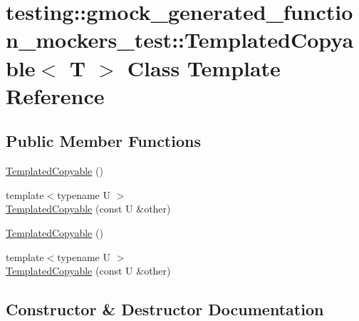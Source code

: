 \hypertarget{classtesting_1_1gmock__generated__function__mockers__test_1_1_templated_copyable}{}\section{testing\+::gmock\+\_\+generated\+\_\+function\+\_\+mockers\+\_\+test\+::Templated\+Copyable$<$ T $>$ Class Template Reference}
\label{classtesting_1_1gmock__generated__function__mockers__test_1_1_templated_copyable}
\subsection*{Public Member Functions}
\begin{DoxyCompactItemize}
\item 
\mbox{\hyperlink{classtesting_1_1gmock__generated__function__mockers__test_1_1_templated_copyable_adf0e1681c62cab82b13f0f97543b25ad}{Templated\+Copyable}} ()
\item 
{\footnotesize template$<$typename U $>$ }\\\mbox{\hyperlink{classtesting_1_1gmock__generated__function__mockers__test_1_1_templated_copyable_aa2602f77d7f6bebfbc35c859637cd1f3}{Templated\+Copyable}} (const U \&other)
\item 
\mbox{\hyperlink{classtesting_1_1gmock__generated__function__mockers__test_1_1_templated_copyable_adf0e1681c62cab82b13f0f97543b25ad}{Templated\+Copyable}} ()
\item 
{\footnotesize template$<$typename U $>$ }\\\mbox{\hyperlink{classtesting_1_1gmock__generated__function__mockers__test_1_1_templated_copyable_aa2602f77d7f6bebfbc35c859637cd1f3}{Templated\+Copyable}} (const U \&other)
\end{DoxyCompactItemize}


\subsection{Constructor \& Destructor Documentation}
\mbox{\label{classtesting_1_1gmock__generated__function__mockers__test_1_1_templated_copyable_adf0e1681c62cab82b13f0f97543b25ad}} 
